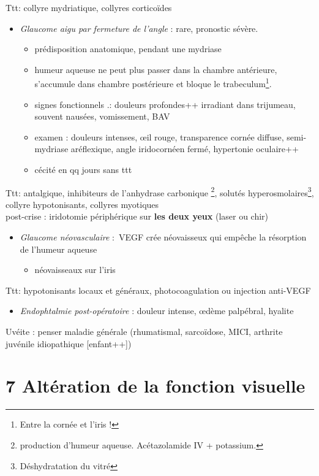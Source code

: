 \documentclass[11pt]{article}
\def\ttt{\hspace*{1cm}Ttt: }
\begin{document}
\ttt collyre mydriatique, collyres corticoïdes
\begin{itemize}
\item \emph{Glaucome aigu par fermeture de l'angle} : rare, pronostic sévère.
\begin{itemize}
\item prédisposition anatomique, pendant une mydriase
\item humeur aqueuse ne peut plus passer dans la chambre antérieure, s'accumule
dans chambre postérieure et bloque le trabeculum\footnote{Entre la cornée et l'iris !}.
\item signes fonctionnels .: douleurs profondes++ irradiant dans trijumeau,
souvent nausées, vomissement, BAV
\item examen : douleurs intenses, \oe{}il rouge, transparence cornée \dec diffuse,
semi-mydriase aréflexique, angle iridocornéen fermé, hypertonie oculaire++
\item cécité en qq jours sans ttt \danger
\end{itemize}
\end{itemize}
\ttt antalgique, inhibiteurs de l'anhydrase carbonique \footnote{\dec production d'humeur aqueuse. Acétazolamide IV + potassium.}\skull, solutés hyperosmolaires\footnote{Déshydratation du vitré}, collyre hypotonisants,
    collyres myotiques\\
  post-crise : iridotomie périphérique sur \textbf{les deux yeux} (laser ou chir)
\begin{itemize}
\item \emph{Glaucome néovasculaire} : VEGF crée néovaisseux qui empêche la résorption de
l'humeur aqueuse
\begin{itemize}
\item néovaisseaux sur l'iris
\end{itemize}
\end{itemize}
\ttt hypotonisants locaux et généraux, photocoagulation ou injection anti-VEGF
\begin{itemize}
\item \emph{Endophtalmie post-opératoire} : douleur intense, \oe{}dème palpébral, hyalite
\end{itemize}

\begin{tcolorbox}
Uvéite : penser maladie générale (rhumatismal, sarcoïdose, MICI, arthrite juvénile idiopathique [enfant++])
\end{tcolorbox}

\section{7 Altération de la fonction visuelle}
\label{sec:orga7c5003}
\end{document}
